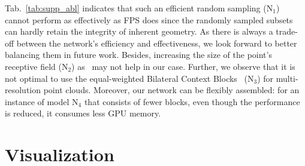 \documentclass[10pt,twocolumn,letterpaper]{article}
\def\ourblocks{Bilateral Context Blocks}
\begin{document}
Tab.~\ref{tab:supp_abl} indicates that such an efficient random sampling ($\mathrm{N}_1$) cannot perform as effectively as FPS does since the randomly sampled subsets can hardly retain the integrity of inherent geometry. As there is always a trade-off between the network's efficiency and effectiveness, we look forward to better balancing them in future work. Besides, increasing the size of the point's receptive field ($\mathrm{N}_2$) as~\cite{engelmann2020dilated} may not help in our case. Further, we observe that it is not optimal to use the equal-weighted \ourblocks~ ($\mathrm{N}_3$) for multi-resolution point clouds. Moreover, our network can be flexibly assembled: for an instance of model $\mathrm{N}_4$ that consists of fewer blocks, even though the performance is reduced, it consumes less GPU memory. 

\begin{table}
\begin{center}
\end{center}
\vspace{-2mm}
\caption{The general \emph{changes} ($\times10^{-3}$) of neighborhoods by involving bilateral offsets.}
\label{tab:bilateral_behave}
\end{table}

\section{Visualization}
\end{document}
